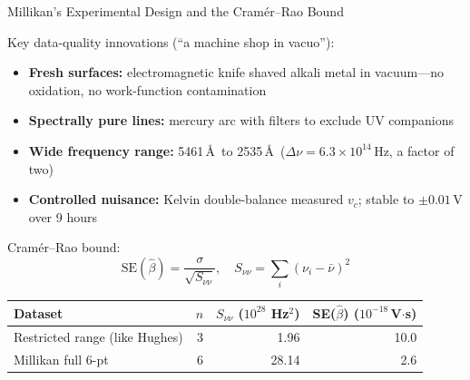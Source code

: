 \documentclass[aspectratio=169]{beamer}
\begin{document}
\begin{frame}{Millikan's Experimental Design and the Cram\'er--Rao Bound}

Key data-quality innovations (``a machine shop in vacuo''):
\begin{itemize}
  \item \textbf{Fresh surfaces:} electromagnetic knife shaved alkali metal
    in vacuum---no oxidation, no work-function contamination
  \item \textbf{Spectrally pure lines:} mercury arc with filters to exclude
    UV companions
  \item \textbf{Wide frequency range:} 5461\,\AA\ to 2535\,\AA\
    ($\Delta\nu = 6.3\times10^{14}$\,Hz, a factor of two)
  \item \textbf{Controlled nuisance:} Kelvin double-balance measured $v_c$;
    stable to $\pm 0.01$\,V over 9 hours
\end{itemize}

\medskip
Cram\'er--Rao bound:
\[
  \mathrm{SE}(\hat\beta) = \frac{\sigma}{\sqrt{S_{\nu\nu}}},
  \quad S_{\nu\nu} = \sum_i(\nu_i - \bar\nu)^2
\]

\begin{center}
\small
\begin{tabular}{p{5.0cm}rrr}
\toprule
Dataset & $n$ & $S_{\nu\nu}$ ($10^{28}$ Hz$^2$) & SE($\hat\beta$) ($10^{-18}$\,V$\cdot$s) \\
\midrule
Restricted range (like Hughes) & 3 & 1.96  & 10.0 \\
Millikan full 6-pt             & 6 & 28.14 &  2.6 \\
\bottomrule
\end{tabular}
\end{center}

\end{frame}
\end{document}
